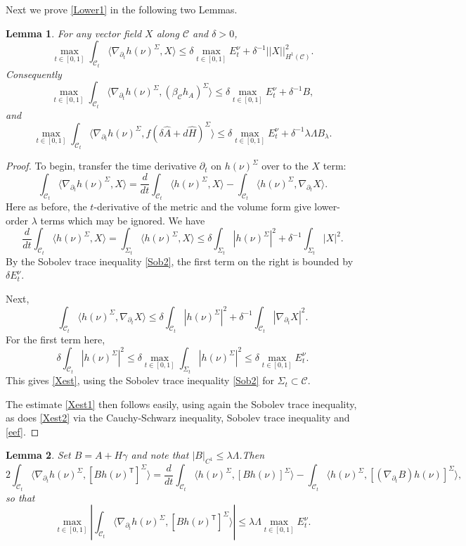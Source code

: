 \documentclass[10pt]{amsart}
\renewcommand{\b}{\beta}
\newcommand{\g}{\gamma}
\renewcommand{\d}{\delta}
\newcommand{\Si}{\Sigma}
\renewcommand{\l}{\lambda}
\newcommand{\cC}{{\mathcal C}}
\newcommand{\tT}{\mathsf{T}}
\newcommand{\be}{\begin{equation}}
\newcommand{\ee}{\end{equation}}
\newcommand{\p}{\partial}
\renewcommand{\hat}{\widehat}
\newcommand{\<}{\langle}
\renewcommand{\>}{\rangle}
\theoremstyle{plain}
\newtheorem{lemma}{Lemma}[section]
\theoremstyle{remark}
\theoremstyle{definition}
\numberwithin{equation}{section}
\begin{document}
 Next we prove \eqref{Lower1} in the following two Lemmas. 
    
 \begin{lemma}\label{Xlemma}
For any vector field $X$ along $\cC$ and $\d > 0$, 
\be \label{Xest}
\max_{t \in [0,1]} \int_{\cC_t} \<\nabla_{\p_t} h(\nu)^{\Si}, X\> \leq \d \max_{t \in [0,1]}E_t ^{\nu}+ \d^{-1} ||X||_{H^1(\cC)}^2.
\ee 
Consequently 
\be \label{Xest1}
\max_{t \in [0,1]} \int_{\cC_t} \<\nabla_{\p_t} h(\nu)^{\Si}, (\b_{\cC}h_A)^{\Si}\> \leq \d \max_{t \in [0,1]}E_t ^{\nu}+ \d^{-1} B, 
\ee 
and 
\be \label{Xest2}
\max_{t \in [0,1]} \int_{\cC_t} \<\nabla_{\p_t} h(\nu)^{\Si}, f(\d \hat A + d\hat H)^{\Si}\> \leq \d \max_{t \in [0,1]}E_t ^{\nu}+ \d^{-1} \l \Lambda B_{\l} . 
\ee 

\end{lemma}

\begin{proof} 
To begin, transfer the time derivative $\p_t$ on $h(\nu)^{\Si}$ over to the $X$ term: 
$$\int_{\cC_t} \<\nabla_{\p_t} h(\nu)^{\Si}, X\> = \frac{d}{dt}\int_{\cC_t}\<h(\nu)^{\Si}, X\> - \int_{\cC_t}\<h(\nu)^{\Si}, \nabla_{\p_t} X\>.$$
Here as before, the $t$-derivative of the metric and the volume form give lower-order $\l$ terms which may be ignored. We have  
$$\frac{d}{dt}\int_{\cC_t}\<h(\nu)^{\Si}, X\> = \int_{\Si_t}\<h(\nu)^{\Si}, X\>  \leq \d \int_{\Si_t}|h(\nu)^{\Si}|^2 + \d^{-1}\int_{\Si_t}|X|^2.$$
By the Sobolev trace inequality \eqref{Sob2}, the first term on the right is bounded by $\d E_t^{\nu}$. 

  Next, 
$$\int_{\cC_t}\<h(\nu)^{\Si}, \nabla_{\p_t} X\> \leq \d \int_{\cC_t}|h(\nu)^{\Si}|^2 + \d^{-1}\int_{\cC_t}|\nabla_{\p_t} X|^2.$$
For the first term here,  
$$ \d \int_{\cC_t}|h(\nu)^{\Si}|^2 \leq \d \max_{t\in [0,1]}\int_{\Si_t}|h(\nu)^{\Si}|^2 \leq \d \max_{t \in [0,1]}E_t^{\nu}.$$ 
This gives \eqref{Xest}, using the Sobolev trace inequality \eqref{Sob2} for $\Si_t \subset \cC$. 

  The estimate \eqref{Xest1} then follows easily, using again the Sobolev trace inequality, as does \eqref{Xest2} via the Cauchy-Schwarz inequality, 
Sobolev trace inequality and \eqref{eef}. 
  
\end{proof}

 
\begin{lemma}\label{Blemma}
Set $B = A+H\g$ and note that $|B|_{C^1} \leq \l \Lambda$.Then 
$$2\int_{\cC_t}\<\nabla_{\p_t} h(\nu)^{\Si}, [B h(\nu)^{\tT}]^{\Si}\> = \frac{d}{dt}\int_{\cC_t}\<h(\nu)^{\Si}, [Bh(\nu)]^{\Si}\> - \int_{\cC_t}\<h(\nu)^{\Si}, 
[(\nabla_{\p_t} B)h(\nu)]^{\Si}\>,$$
so that 
\be \label{B}
\max_{t \in [0,1]} |\int_{\cC_t}\<\nabla_{\p_t} h(\nu)^{\Si}, [Bh(\nu)^{\tT}]^{\Si}\> | \leq \l \Lambda \max_{t \in [0,1]}E_t^{\nu}. 
 \ee
\end{lemma}
\end{document}
